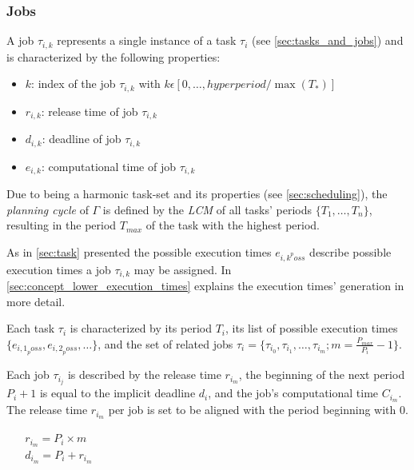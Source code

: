 \subsubsection{Jobs}\label{sec:job}
A job $\tau_{i,k}$ represents a single instance of a task $\tau_i$ (see \cref{sec:tasks_and_jobs}) and is characterized by the following properties:
\begin{itemize}
    \item $k$: index of the job $\tau_{i,k}$ with $k \epsilon [0, \ldots, hyperperiod / \max(T_*)]$
    \item $r_{i,k}$: release time of job $\tau_{i,k}$
    \item $d_{i,k}$: deadline of job $\tau_{i,k}$
    \item $e_{i,k}$: computational time of job $\tau_{i,k}$
\end{itemize}

Due to being a harmonic task-set and its properties (see \cref{sec:scheduling}), the \textit{planning cycle}\cite{dar-tzenpengAssignmentSchedulingCommunicating1997} of $\Gamma$ is defined by the \textit{\ac{LCM}} of all tasks' periods $\{T_1, \ldots, T_n\}$, resulting in the period $T_{max}$ of the task with the highest period. 

As in \cref{sec:task} presented the possible execution times $e_{{i,k}^poss}$ describe possible execution times a job $\tau_{i,k}$ may be assigned.
In \cref{sec:concept_lower_execution_times} explains the execution times' generation in more detail.

Each task $\tau_i$ is characterized by its period $T_i$, its list of possible execution times $\{e_{{i,1}_poss}, e_{{i,2}_poss}, \ldots\}$, and the set of related jobs $\tau_i=\{\tau_{i_0}, \tau_{i_1}, \dots, \tau_{i_m}; m = \frac{P_{max}}{P_i} - 1\}$.

Each job $\tau_{i_j}$ is described by the release time $r_{i_m}$, the beginning of the next period $P_i+1$ is equal to the implicit deadline $d_i$, and the job's computational time $C_{i_m}$. The release time $r_{i_m}$ per job is set to be aligned with the period beginning with $0$.
\begin{center}
    $r_{i_m} = P_i \times m$ \\
    $d_{i_m} = P_i + r_{i_m}$
\end{center}

